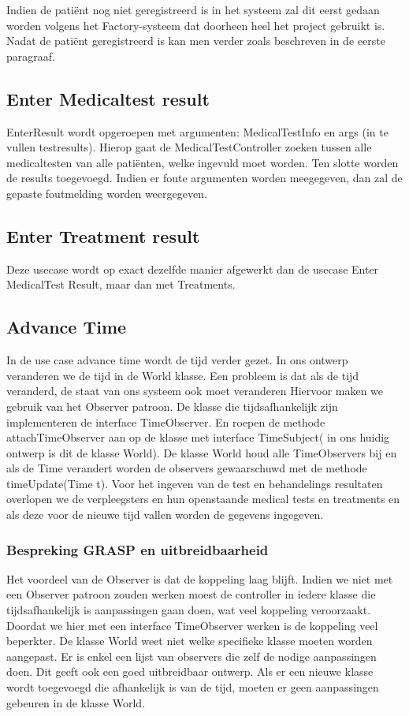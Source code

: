 \documentclass[a4paper]{article}
\begin{document}
Indien de pati\"ent nog niet geregistreerd is in het systeem zal dit eerst gedaan worden volgens het Factory-systeem dat doorheen heel het project  gebruikt is. Nadat de pati\"ent geregistreerd is kan men verder zoals beschreven in de eerste paragraaf.
\subsection{Enter Medicaltest result}
EnterResult wordt opgeroepen met argumenten: MedicalTestInfo en args (in te vullen testresults). Hierop gaat de MedicalTestController zoeken tussen alle medicaltesten van alle pati\"enten, welke ingevuld moet worden. Ten slotte worden de results toegevoegd. Indien er foute argumenten worden meegegeven, dan zal de gepaste foutmelding worden weergegeven.
\subsection{Enter Treatment result}
Deze usecase wordt op exact dezelfde manier afgewerkt dan de usecase Enter MedicalTest Result, maar dan met Treatments.

\subsection{Advance Time}

In de use case advance time wordt de tijd verder gezet. In ons ontwerp veranderen we de tijd in de World klasse. Een probleem is dat als de tijd veranderd, de staat van ons systeem ook moet veranderen Hiervoor maken we gebruik van het Observer patroon. De klasse die tijdsafhankelijk zijn implementeren de interface TimeObserver. En roepen de methode attachTimeObserver aan op de klasse met interface TimeSubject( in ons huidig ontwerp is dit de klasse World). De klasse World houd alle TimeObservers bij en als de Time verandert worden de observers gewaarschuwd met de methode timeUpdate(Time t). Voor het ingeven van de test  en behandelings resultaten overlopen we de verpleegsters en hun openstaande medical tests en treatments en als deze voor de nieuwe tijd vallen worden de gegevens ingegeven. 

\subsubsection{Bespreking GRASP en uitbreidbaarheid}

Het voordeel van de Observer is dat de koppeling laag blijft. Indien we niet met een Observer patroon zouden werken moest de controller in iedere klasse die tijdsafhankelijk is aanpassingen gaan doen, wat veel koppeling veroorzaakt. Doordat we hier met een interface TimeObserver werken is de koppeling veel beperkter. De klasse World weet niet welke specifieke klasse moeten worden aangepast. Er is enkel een lijst van observers die zelf de nodige aanpassingen doen. Dit geeft ook een goed uitbreidbaar ontwerp. Als er een nieuwe klasse wordt toegevoegd die afhankelijk is van de tijd, moeten er geen aanpassingen gebeuren in de klasse World. 
\end{document}
